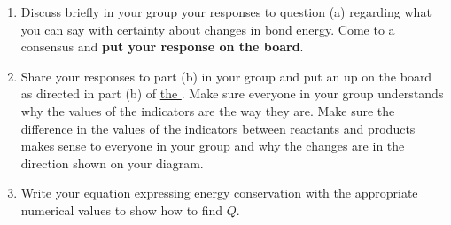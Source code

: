 \begin{enumerate}
	\item Discuss briefly in your group your responses to question (a) regarding what you can say with certainty about changes in bond energy. Come to a consensus and \textbf{put your response on the board}.
	
	
	\item Share your responses to part (b) in your group and put an \EnergyDiagram{} up on the board as directed in part (b) of \hyperref[\FNT1.1.4-1]{the \FNT}. Make sure everyone in your group understands why the values of the indicators are the way they are. Make sure the difference in the values of the indicators between reactants and products makes sense to everyone in your group and why the changes are in the direction shown on your diagram.
	
	
	\item Write your equation expressing energy conservation with the appropriate numerical values to show how to find $Q$.
	
\end{enumerate}

